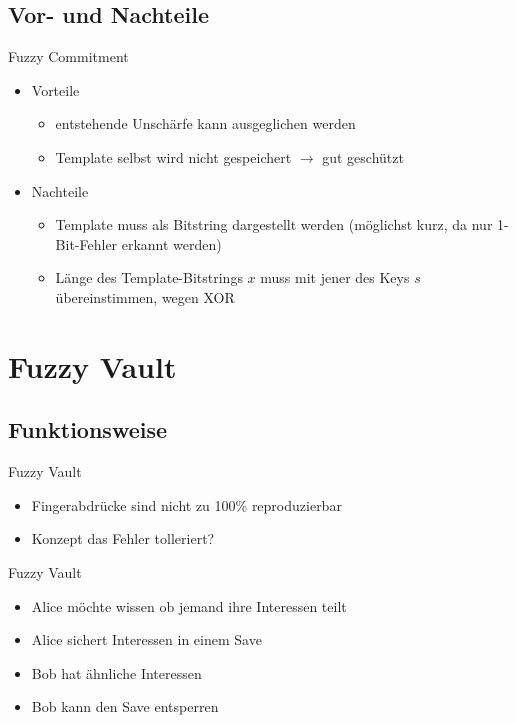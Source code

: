 \documentclass{beamer}
\begin{document}
\subsection{Vor- und Nachteile}
\begin{frame}{Fuzzy Commitment}
	\begin{itemize}
		\item Vorteile	\\[1ex]
		\begin{itemize}
			\item entstehende Unsch\"arfe kann ausgeglichen werden
			\item Template selbst wird nicht gespeichert $\rightarrow$ gut gesch\"utzt
		\end{itemize}
		\item Nachteile \\[1ex]
		\begin{itemize}
			\item Template muss als Bitstring dargestellt werden (möglichst kurz, da nur 1-Bit-Fehler erkannt werden)
			\item L\"ange des Template-Bitstrings $x$ muss mit jener des Keys $s$ übereinstimmen, wegen XOR
		\end{itemize}
	\end{itemize}
\end{frame}


\section{Fuzzy Vault}
\subsection{Funktionsweise}
\begin{frame}{Fuzzy Vault}
	\begin{itemize}
		\item Fingerabdrücke sind nicht zu 100\% reproduzierbar\\[1.5 ex]
		\item Konzept das Fehler tolleriert?\\[1.5 ex]
	\end{itemize}
\end{frame}
\begin{frame}{Fuzzy Vault}
	\begin{itemize}
		\item Alice möchte wissen ob jemand ihre Interessen teilt \\[1.5 ex]
		\item Alice sichert Interessen in einem Save\\[1.5 ex]
		\item Bob hat ähnliche Interessen\\[1.5 ex]
		\item Bob kann den Save entsperren\\[1.5 ex]
	\end{itemize}
\end{frame}
\end{document}
